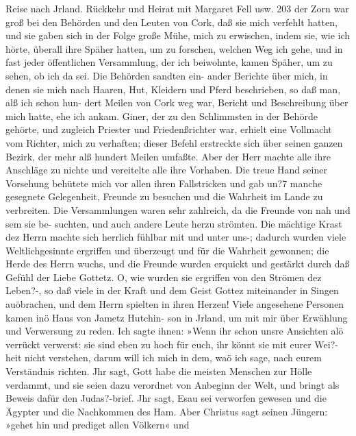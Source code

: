 Reise nach Jrland. Rückkehr und Heirat mit Margaret Fell usw. 203
der Zorn war groß bei den Behörden und den Leuten von Cork,
daß sie mich verfehlt hatten, und sie gaben sich in der Folge
große Mühe, mich zu erwischen, indem sie, wie ich hörte, überall
ihre Späher hatten, um zu forschen, welchen Weg ich gehe, und
in fast jeder öffentlichen Versammlung, der ich beiwohnte, kamen
Späher, um zu sehen, ob ich da sei. Die Behörden sandten ein-
ander Berichte über mich, in denen sie mich nach Haaren, Hut,
Kleidern und Pferd beschrieben, so daß man, alß ich schon hun-
dert Meilen von Cork weg war, Bericht und Beschreibung über
mich hatte, ehe ich ankam. Giner, der zu den Schlimmsten in
der Behörde gehörte, und zugleich Priester und Friedenßrichter
war, erhielt eine Vollmacht vom Richter, mich zu verhaften; dieser
Befehl erstreckte sich über seinen ganzen Bezirk, der mehr alß
hundert Meilen umfaßte. Aber der Herr machte alle ihre
Anschläge zu nichte und vereitelte alle ihre Vorhaben. Die treue
Hand seiner Vorsehung behütete mich vor allen ihren Fallstricken
und gab un?7 manche gesegnete Gelegenheit, Freunde zu besuchen
und die Wahrheit im Lande zu verbreiten. Die Versammlungen
waren sehr zahlreich, da die Freunde von nah und sem sie be-
suchten, und auch andere Leute herzu strömten. Die mächtige
Krast dez Herrn machte sich herrlich fühlbar mit und unter uns-;
dadurch wurden viele Weltlichgesinnte ergriffen und überzeugt
und für die Wahrheit gewonnen; die Herde des Herrn wuchs,
und die Freunde wurden erquickt und gestärkt durch daß Gefühl
der Liebe Gottetz. O, wie wurden sie ergriffen von den Strömen
dez Leben?-, so daß viele in der Kraft und dem Geist Gottez
miteinander in Singen auöbrachen, und dem Herrn spielten in
ihren Herzen!
Viele angesehene Personen kamen inö Haus von Jametz Hutchin-
son in Jrland, um mit mir über Erwählung und Verwersung zu
reden. Ich sagte ihnen: »Wenn ihr schon unsre Ansichten alö
verrückt verwerst: sie sind eben zu hoch für euch, ihr könnt sie
mit eurer Wei?-heit nicht verstehen, darum will ich mich in dem,
waö ich sage, nach eurem Verständnis richten. Jhr sagt, Gott
habe die meisten Menschen zur Hölle verdammt, und sie seien
dazu verordnet von Anbeginn der Welt, und bringt als Beweis
dafür den Judas?-brief. Jhr sagt, Esau sei verworfen gewesen
und die Ägypter und die Nachkommen des Ham. Aber Christus
sagt seinen Jüngern: »gehet hin und prediget allen Völkern« und


